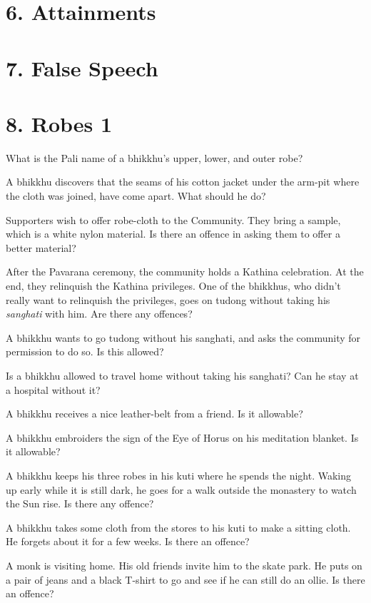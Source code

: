 \section{6. Attainments}

\section{7. False Speech}

\section{8. Robes 1}

What is the Pali name of a bhikkhu's upper, lower, and outer robe?

A bhikkhu discovers that the seams of his cotton jacket under the
arm-pit where the cloth was joined, have come apart. What should he do?

Supporters wish to offer robe-cloth to the Community. They bring a
sample, which is a white nylon material. Is there an offence in asking
them to offer a better material?

After the Pavarana ceremony, the community holds a Kathina celebration.
At the end, they relinquish the Kathina privileges. One of the bhikkhus,
who didn't really want to relinquish the privileges, goes on tudong
without taking his \emph{sanghati} with him. Are there any offences?

A bhikkhu wants to go tudong without his sanghati, and asks the
community for permission to do so. Is this allowed?

Is a bhikkhu allowed to travel home without taking his sanghati? Can he
stay at a hospital without it?

A bhikkhu receives a nice leather-belt from a friend. Is it allowable?

A bhikkhu embroiders the sign of the Eye of Horus on his meditation
blanket. Is it allowable?

A bhikkhu keeps his three robes in his kuti where he spends the night.
Waking up early while it is still dark, he goes for a walk outside the
monastery to watch the Sun rise. Is there any offence?

A bhikkhu takes some cloth from the stores to his kuti to make a sitting
cloth. He forgets about it for a few weeks. Is there an offence?

A monk is visiting home. His old friends invite him to the skate park.
He puts on a pair of jeans and a black T-shirt to go and see if he can
still do an ollie. Is there an offence?

